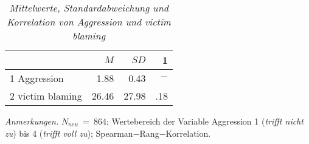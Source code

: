 \begin{table}[htb]
    \caption[Mittelwerte, Standardabweichung und Korrelation von Aggression und victim blaming]{\textit {Mittelwerte, Standardabweichung und Korrelation von Aggression und victim blaming}} 
    \label{H1_Spearman}
    \centering
    \begin{adjustbox}{width=6.5cm} %
    \small
    \begin{tabular}{lrrr}
      \hline
        & $M$   & $SD$ & 1 \\
      \hline
    1 Aggression      & 1.88  & 0.43   & $-$      \\
    2 victim blaming  & 26.46 & 27.98  & .18      \\
       \hline
    \end{tabular}
    \end{adjustbox}
    
    \begin{tablenotes}
        \item \textit{Anmerkungen.} \( N_{neu} \)~=~864; Wertebereich der Variable Aggression 1 (\textit{trifft nicht zu}) bis 4 (\textit{trifft voll zu}); Spearman$-$Rang$-$Korrelation.
      \end{tablenotes}
    \end{table}

